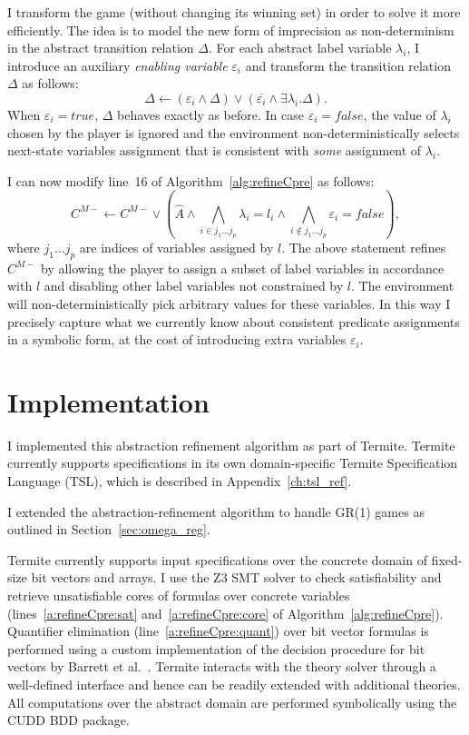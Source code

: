 I transform the game (without changing its winning set) in order to solve it more efficiently.  The idea is to model the new form of imprecision as non-determinism in the abstract transition relation $\Delta$.  For each abstract label variable $\lambda_i$, I introduce an auxiliary \emph{enabling variable} $\varepsilon_i$ and transform the transition relation $\Delta$ as follows:
$$
\Delta \gets (\varepsilon_i \land \Delta) \lor (\overline{\varepsilon_i} \land \exists \lambda_i. \Delta).
$$
When $\varepsilon_i=true$, $\Delta$ behaves exactly as before.  In case $\varepsilon_i=false$, the value of $\lambda_i$ chosen by the player is ignored and the environment non-deterministically selects next-state variables assignment that is consistent with \emph{some} assignment of $\lambda_i$. 

I can now modify line~16 of Algorithm~\ref{alg:refineCpre} as follows:
$$
C^{M-} \gets C^{M-} \lor (\hat{A}\land \bigwedge_{i\in{j_1\ldots j_p}}\lambda_i=l_i \land \bigwedge_{i\not\in{j_1\ldots j_p}}\varepsilon_i=false),
$$
where $j_1\ldots j_p$ are indices of variables assigned by $l$.  The above statement refines $C^{M-}$ by allowing the player to assign a subset of label variables in accordance with $l$ and disabling other label variables not constrained by $l$.  The environment will non-deterministically pick arbitrary values for these variables.  In this way I precisely capture what we currently know about consistent predicate assignments in a symbolic form, at the cost of introducing extra variables $\varepsilon_i$.

\section{Implementation}
I implemented this abstraction refinement algorithm as part of Termite. Termite currently supports specifications in its own domain-specific Termite Specification Language (TSL), which is described in Appendix~\ref{ch:tsl_ref}.

I extended the abstraction-refinement algorithm to handle GR(1) games as outlined in Section~\ref{sec:omega_reg}.

Termite currently supports input specifications over the concrete domain of fixed-size bit vectors and arrays.  I use the Z3 SMT solver to check satisfiability and retrieve unsatisfiable cores of formulas over concrete variables (lines~\ref{a:refineCpre:sat} and~\ref{a:refineCpre:core} of Algorithm~\ref{alg:refineCpre}).  Quantifier elimination (line~\ref{a:refineCpre:quant}) over bit vector formulas is performed using a custom implementation of the decision procedure for bit vectors by Barrett et al.~\cite{Barrett_DL_98}.  Termite interacts with the theory solver through a well-defined interface and hence can be readily extended with additional theories.  All computations over the abstract domain are performed symbolically using the CUDD BDD package.  

